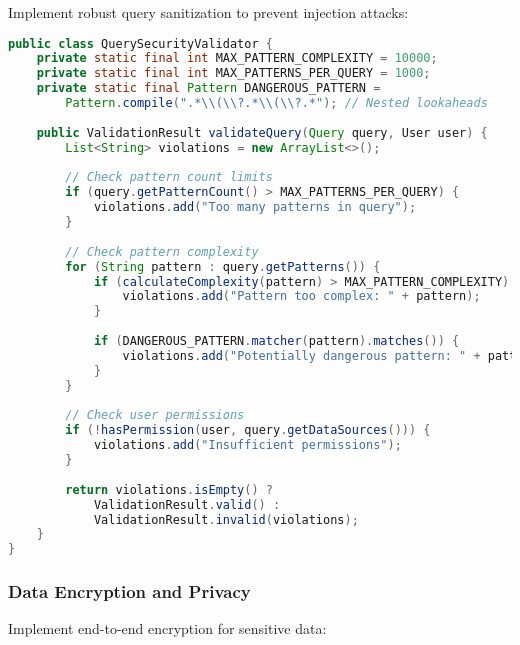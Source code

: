 \documentclass[11pt,a4paper]{article}
\begin{document}
Implement robust query sanitization to prevent injection attacks:

\begin{lstlisting}[language=Java, caption=Query Security Validation]
public class QuerySecurityValidator {
    private static final int MAX_PATTERN_COMPLEXITY = 10000;
    private static final int MAX_PATTERNS_PER_QUERY = 1000;
    private static final Pattern DANGEROUS_PATTERN = 
        Pattern.compile(".*\\(\\?.*\\(\\?.*"); // Nested lookaheads
    
    public ValidationResult validateQuery(Query query, User user) {
        List<String> violations = new ArrayList<>();
        
        // Check pattern count limits
        if (query.getPatternCount() > MAX_PATTERNS_PER_QUERY) {
            violations.add("Too many patterns in query");
        }
        
        // Check pattern complexity
        for (String pattern : query.getPatterns()) {
            if (calculateComplexity(pattern) > MAX_PATTERN_COMPLEXITY) {
                violations.add("Pattern too complex: " + pattern);
            }
            
            if (DANGEROUS_PATTERN.matcher(pattern).matches()) {
                violations.add("Potentially dangerous pattern: " + pattern);
            }
        }
        
        // Check user permissions
        if (!hasPermission(user, query.getDataSources())) {
            violations.add("Insufficient permissions");
        }
        
        return violations.isEmpty() ? 
            ValidationResult.valid() : 
            ValidationResult.invalid(violations);
    }
}
\end{lstlisting}

\subsubsection{Data Encryption and Privacy}

Implement end-to-end encryption for sensitive data:
\end{document}
